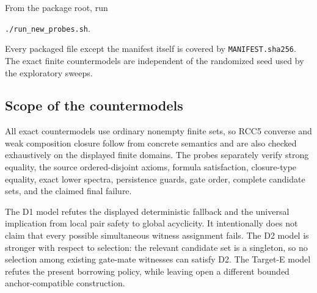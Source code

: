 \documentclass[11pt]{article}
\begin{document}
From the package root, run
\begin{center}
\texttt{./run\_new\_probes.sh}.
\end{center}
Every packaged file except the manifest itself is covered by
\texttt{MANIFEST.sha256}. The exact finite countermodels are independent of the
randomized seed used by the exploratory sweeps.

\subsection{Scope of the countermodels}

All exact countermodels use ordinary nonempty finite sets, so RCC5 converse and weak
composition closure follow from concrete semantics and are also checked exhaustively on
the displayed finite domains. The probes separately verify strong equality, the source
ordered-disjoint axioms, formula satisfaction, closure-type equality, exact lower
spectra, persistence guards, gate order, complete candidate sets, and the claimed final
failure.

The D1 model refutes the displayed deterministic fallback and the universal implication
from local pair safety to global acyclicity. It intentionally does not claim that every
possible simultaneous witness assignment fails. The D2 model is stronger with respect
to selection: the relevant candidate set is a singleton, so no selection among existing
gate-mate witnesses can satisfy D2. The Target-E model refutes the present borrowing
policy, while leaving open a different bounded anchor-compatible construction.

\endgroup
\end{document}
